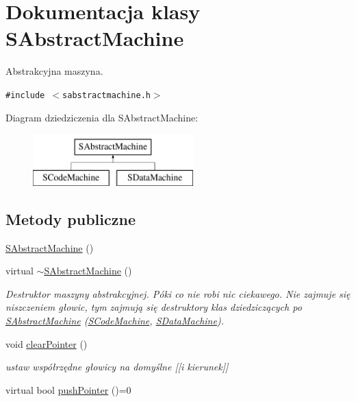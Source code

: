 \hypertarget{classSAbstractMachine}{
\section{Dokumentacja klasy SAbstractMachine}
\label{classSAbstractMachine}
}
Abstrakcyjna maszyna.  


{\tt \#include $<$sabstractmachine.h$>$}

Diagram dziedziczenia dla SAbstractMachine:\begin{figure}[H]
\begin{center}
\leavevmode
\includegraphics[height=2cm]{classSAbstractMachine}
\end{center}
\end{figure}
\subsection*{Metody publiczne}
\begin{CompactItemize}
\item 
\hyperlink{classSAbstractMachine_f0ffb270de2ea44e89123a873bc5660a}{SAbstractMachine} ()
\item 
\hypertarget{classSAbstractMachine_2c4c79bd629a2961fb520785ce3adf4b}{
virtual \hyperlink{classSAbstractMachine_2c4c79bd629a2961fb520785ce3adf4b}{$\sim$SAbstractMachine} ()}
\label{classSAbstractMachine_2c4c79bd629a2961fb520785ce3adf4b}

\begin{CompactList}\small\item\em Destruktor maszyny abstrakcyjnej. Póki co nie robi nic ciekawego. Nie zajmuje się niszczeniem głowic, tym zajmują się destruktory klas dziedziczących po \hyperlink{classSAbstractMachine}{SAbstractMachine} (\hyperlink{classSCodeMachine}{SCodeMachine}, \hyperlink{classSDataMachine}{SDataMachine}). \item\end{CompactList}\item 
void \hyperlink{classSAbstractMachine_87766a003773869a3438e92739d7c9a1}{clearPointer} ()
\begin{CompactList}\small\item\em ustaw współrzędne głowicy na domyślne \mbox{[}\mbox{[}i kierunek\mbox{]}\mbox{]} \item\end{CompactList}\item 
virtual bool \hyperlink{classSAbstractMachine_72a47b72416e0d2f24fcf36415d37404}{pushPointer} ()=0
\end{CompactItemize}
